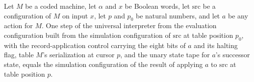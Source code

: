 \begin{lemma}
\label{Turing.timed_apply_record}
\leanok
{}
Let $M$ be a coded machine, let $\alpha$ and $x$ be Boolean words, let $\mathrm{src}$ be
a configuration of $M$ on input $x$, let $p$ and $p_0$ be natural numbers, and let $a$
be any action for $M$. One step of the universal interpreter from the evaluation
configuration built from the simulation configuration of $\mathrm{src}$ at table
position $p_0$, with the record-application control carrying the eight bits of $a$ and
its halting flag, table $M$'s serialization at cursor $p$, and the unary state tape for
$a$'s successor state, equals the simulation configuration of the result of applying $a$
to $\mathrm{src}$ at table position $p$.
\end{lemma}

